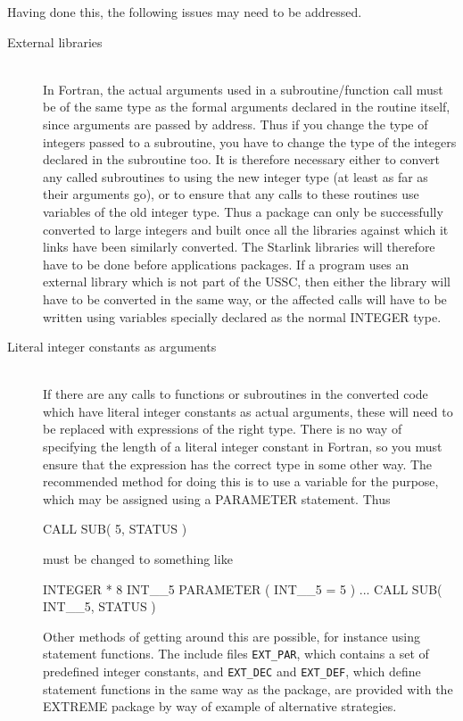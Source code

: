 \documentclass[twoside,11pt,nolof]{starlink}
\providecommand{\file}[1]{\texttt{#1}}
\providecommand{\ditem}[1]{\item[#1]\mbox{}\\}
\newenvironment{squote}{\begin{small}}{\end{small}}
\begin{document}
Having done this, the following issues may need to be addressed.
\begin{description}
%
\ditem{External libraries}
In Fortran, the actual arguments used in a subroutine/function
call must be of the same type as the formal arguments declared
in the routine itself, since arguments are passed by address.
Thus if you change the type of integers passed to a subroutine,
you have to change the type of the integers declared in the subroutine too.
It is therefore necessary either to convert any called subroutines
to using the new integer type (at least as far as their arguments go),
or to ensure that any calls to these routines use variables of
the old integer type.
Thus a package can only be successfully converted to large integers
and built once all the libraries against which it links have been
similarly converted.  The Starlink libraries will therefore have to
be done before applications packages.
If a program uses an external library which is not part of the USSC,
then either the library will have to be converted in the same way,
or the affected calls will have to be written using
variables specially declared as the normal INTEGER type.
%
\ditem{Literal integer constants as arguments}
If there are any calls to functions or subroutines in the converted
code which have literal integer constants as actual arguments,
these will need to be replaced with expressions of the right type.
There is no way of specifying the length of a literal integer constant
in Fortran, so you must ensure that the expression has the correct type
in some other way.
The recommended method for doing this is to use a variable for the
purpose, which may be assigned using a PARAMETER statement.
Thus
\begin{squote}
\begin{terminalv}
      CALL SUB( 5, STATUS )
\end{terminalv}
\end{squote}
must be changed to something like
\begin{squote}
\begin{terminalv}
      INTEGER * 8 INT__5
      PARAMETER ( INT__5 = 5 )
        ...
      CALL SUB( INT__5, STATUS )
\end{terminalv}
\end{squote}
Other methods of getting around this are possible,
for instance using statement functions.
The include files \file{EXT\_PAR}, which contains a set of predefined
integer constants, and \file{EXT\_DEC} and \file{EXT\_DEF},
which define statement functions in the same way as the
 package, are provided with the EXTREME
package by way of example of alternative strategies.


\end{description}
\end{document}
